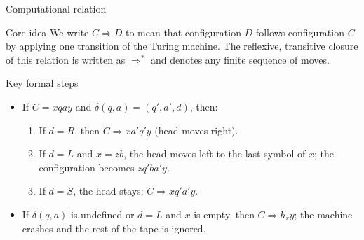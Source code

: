\begin{frame}[t]{Computational relation}
  \begin{tblock}{Core idea}
    We write $C \Rightarrow D$ to mean that configuration $D$ follows
    configuration $C$ by applying one transition of the Turing machine.
    The reflexive, transitive closure of this relation is written as
    $\Rightarrow^*$ and denotes any finite sequence of moves.
  \end{tblock}
  \begin{tblock}{Key formal steps}
    \begin{itemize}
      \item If $C = xqay$ and $\delta(q,a)=(q',a',d)$, then:
        \begin{enumerate}
          \item If $d=R$, then $C \Rightarrow x a' q' y$ (head moves right).
          \item If $d=L$ and $x=zb$, the head moves left to the last
            symbol of $x$; the configuration becomes $z q' b a' y$.
          \item If $d=S$, the head stays: $C \Rightarrow x q' a' y$.
        \end{enumerate}
      \item If $\delta(q,a)$ is undefined or $d=L$ and $x$ is empty,
        then $C \Rightarrow h_r y$; the machine crashes and the rest of
        the tape is ignored.
    \end{itemize}
  \end{tblock}
  \label{fr:7.1-12}
\end{frame}

